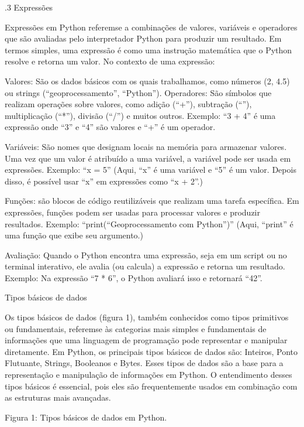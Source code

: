 \documentclass[letterpaper,10pt,english]{jupyterBook}
\begin{document}
.3 Expressões

\sphinxAtStartPar
Expressões em Python referem\sphinxhyphen{}se a combinações de valores, variáveis e operadores que são avaliadas pelo interpretador Python para produzir um resultado. Em termos simples, uma expressão é como uma instrução matemática que o Python resolve e retorna um valor. No contexto de uma expressão:

\sphinxAtStartPar
Valores: São os dados básicos com os quais trabalhamos, como números (2, 4.5) ou strings (“geoprocessamento”, “Python”).
Operadores: São símbolos que realizam operações sobre valores, como adição (“+”), subtração (“\sphinxhyphen{}”), multiplicação (“*”), divisão (“/”) e muitos outros.
Exemplo: “3 + 4” é uma expressão onde “3” e “4” são valores e “+” é um operador.

\sphinxAtStartPar
Variáveis: São nomes que designam locais na memória para armazenar valores. Uma vez que um valor é atribuído a uma variável, a variável pode ser usada em expressões.
Exemplo: “x = 5” (Aqui, “x” é uma variável e “5” é um valor. Depois disso, é possível usar “x” em expressões como “x + 2”.)

\sphinxAtStartPar
Funções: são blocos de código reutilizáveis que realizam uma tarefa específica. Em expressões, funções podem ser usadas para processar valores e produzir resultados.
Exemplo: “print(“Geoprocessamento com Python”)” (Aqui, “print” é uma função que exibe seu argumento.)

\sphinxAtStartPar
Avaliação: Quando o Python encontra uma expressão, seja em um script ou no terminal interativo, ele avalia (ou calcula) a expressão e retorna um resultado.
Exemplo: Na expressão “7 * 6”, o Python avaliará isso e retornará “42”.

\sphinxAtStartPar
Tipos básicos de dados

\sphinxAtStartPar
Os tipos básicos de dados (figura 1), também conhecidos como tipos primitivos ou fundamentais, referem\sphinxhyphen{}se às categorias mais simples e fundamentais de informações que uma linguagem de programação pode representar e manipular diretamente. Em Python, os principais tipos básicos de dados são: Inteiros, Ponto Flutuante, Strings, Booleanos e Bytes. Esses tipos de dados são a base para a representação e manipulação de informações em Python. O entendimento desses tipos básicos é essencial, pois eles são frequentemente usados em combinação com as estruturas mais avançadas.

\sphinxAtStartPar
Figura 1: Tipos básicos de dados em Python.
\end{document}
